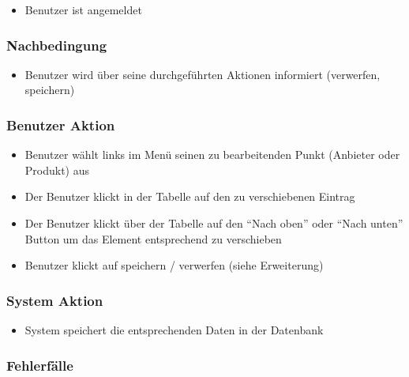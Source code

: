 \documentclass[a4paper,12pt]{article}
\begin{document}
\begin{itemize}

\item
  Benutzer ist angemeldet
\end{itemize}

\subsubsection{Nachbedingung}\label{nachbedingung-9}

\begin{itemize}

\item
  Benutzer wird über seine durchgeführten Aktionen informiert
  (verwerfen, speichern)
\end{itemize}

\subsubsection{Benutzer Aktion}\label{benutzer-aktion-9}

\begin{itemize}

\item
  Benutzer wählt links im Menü seinen zu bearbeitenden Punkt (Anbieter
  oder Produkt) aus
\item
  Der Benutzer klickt in der Tabelle auf den zu verschiebenen Eintrag
\item
  Der Benutzer klickt über der Tabelle auf den ``Nach oben'' oder ``Nach
  unten'' Button um das Element entsprechend zu verschieben
\item
  Benutzer klickt auf speichern / verwerfen (siehe Erweiterung)
\end{itemize}

\subsubsection{System Aktion}\label{system-aktion-9}

\begin{itemize}

\item
  System speichert die entsprechenden Daten in der Datenbank
\end{itemize}

\subsubsection{Fehlerfälle}\label{fehlerfalle-9}
\end{document}
